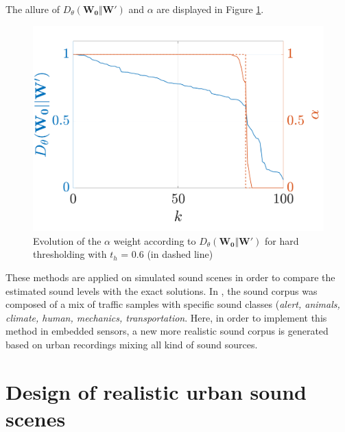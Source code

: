 \documentclass[review,5p,twocolumn,sort&compress,times]{elsarticle}
\begin{document}
The allure of $D_{\theta}\left(\mathbf{W_0} \Vert \mathbf{W'} \right)$ and $\alpha$ are displayed in Figure \ref{fig:example_threshold}.\\

\begin{figure}[t]
    \centering
       \includegraphics[width=0.9\linewidth]{./figures/thresh.pdf}
    \caption{Evolution of the $\alpha$ weight according to $D_{\theta}\left(\mathbf{W_0} \Vert \mathbf{W'} \right)$ for hard thresholding with $t_h$ = 0.6 (in dashed line)}
    \label{fig:example_threshold}
\end{figure}

These methods are applied on simulated sound scenes in order to compare the estimated sound levels with the exact solutions. In \cite{}, the sound corpus was composed of a mix of traffic samples with specific sound classes (\textit{alert, animals, climate, human, mechanics, transportation}. Here, in order to implement this method in embedded sensors, a new more realistic sound corpus is generated based on urban recordings mixing all kind of sound sources.

\section{Design of realistic urban sound scenes}\label{part:urban_scene}
\end{document}
